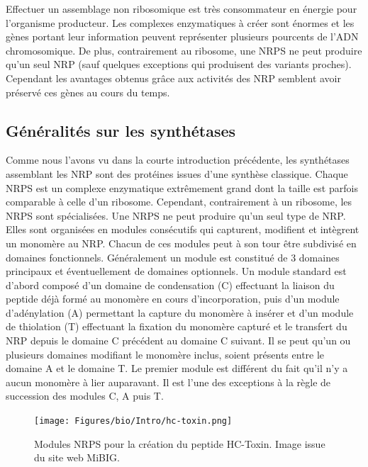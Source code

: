 Effectuer un assemblage non ribosomique est très consommateur en énergie pour l'organisme producteur.
Les complexes enzymatiques à créer sont énormes et les gènes portant leur information peuvent représenter plusieurs pourcents de l'ADN chromosomique.
De plus, contrairement au ribosome, une NRPS ne peut produire qu'un seul NRP (sauf quelques exceptions qui produisent des variants proches).
Cependant les avantages obtenus grâce aux activités des NRP semblent avoir préservé ces gènes au cours du temps.


\subsection{Généralités sur les synthétases}

Comme nous l'avons vu dans la courte introduction précédente, les synthétases assemblant les NRP sont des protéines issues d'une synthèse classique.
Chaque NRPS est un complexe enzymatique extrêmement grand dont la taille est parfois comparable à celle d'un ribosome.
Cependant, contrairement à un ribosome, les NRPS sont spécialisées.
Une NRPS ne peut produire qu'un seul type de NRP.
Elles sont organisées en modules consécutifs qui capturent, modifient et intègrent un monomère au NRP\cite{schwarzer_nonribosomal_2003,marahiel_modular_1997}.
Chacun de ces modules peut à son tour être subdivisé en domaines fonctionnels.
Généralement un module est constitué de 3 domaines principaux et éventuellement de domaines optionnels\cite{finking_biosynthesis_2004}.
Un module standard est d'abord composé d'un domaine de condensation (C) effectuant la liaison du peptide déjà formé au monomère en cours d'incorporation, puis d'un module d'adénylation (A) permettant la capture du monomère à insérer et d'un module de thiolation (T) effectuant la fixation du monomère capturé et le transfert du NRP depuis le domaine C précédent au domaine C suivant.
Il se peut qu'un ou plusieurs domaines modifiant le monomère inclus, soient présents entre le domaine A et le domaine T.
Le premier module est différent du fait qu'il n'y a aucun monomère à lier auparavant.
Il est l'une des exceptions à la règle de succession des modules C, A puis T.

\begin{figure}[h!]
  \begin{center}
    \texttt{[image: Figures/bio/Intro/hc-toxin.png]}
    \caption{\label{mibig_hc}Modules NRPS pour la création du peptide HC-Toxin.
    Image issue du site web MiBIG.}
  \end{center}
\end{figure}

